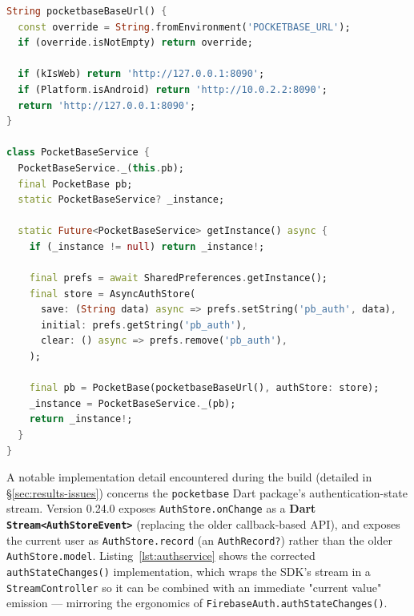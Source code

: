 \documentclass[11pt,a4paper]{article}
\begin{document}
\begin{lstlisting}[language=Dart,caption={\texttt{lib/core/services/pocketbase\_service.dart} --- PocketBase client singleton with persisted auth.},label={lst:pbservice}]
String pocketbaseBaseUrl() {
  const override = String.fromEnvironment('POCKETBASE_URL');
  if (override.isNotEmpty) return override;

  if (kIsWeb) return 'http://127.0.0.1:8090';
  if (Platform.isAndroid) return 'http://10.0.2.2:8090';
  return 'http://127.0.0.1:8090';
}

class PocketBaseService {
  PocketBaseService._(this.pb);
  final PocketBase pb;
  static PocketBaseService? _instance;

  static Future<PocketBaseService> getInstance() async {
    if (_instance != null) return _instance!;

    final prefs = await SharedPreferences.getInstance();
    final store = AsyncAuthStore(
      save: (String data) async => prefs.setString('pb_auth', data),
      initial: prefs.getString('pb_auth'),
      clear: () async => prefs.remove('pb_auth'),
    );

    final pb = PocketBase(pocketbaseBaseUrl(), authStore: store);
    _instance = PocketBaseService._(pb);
    return _instance!;
  }
}
\end{lstlisting}

A notable implementation detail encountered during the build (detailed in
\S\ref{sec:results-issues}) concerns the \texttt{pocketbase} Dart package's
authentication-state stream. Version 0.24.0 exposes
\texttt{AuthStore.onChange} as a \textbf{Dart \texttt{Stream<AuthStoreEvent>}}
(replacing the older callback-based API), and exposes the current user as
\texttt{AuthStore.record} (an \texttt{AuthRecord?}) rather than the older
\texttt{AuthStore.model}. Listing~\ref{lst:authservice} shows the corrected
\texttt{authStateChanges()} implementation, which wraps the SDK's stream in a
\texttt{StreamController} so it can be combined with an immediate "current
value" emission --- mirroring the ergonomics of
\texttt{FirebaseAuth.authStateChanges()}.
\end{document}
